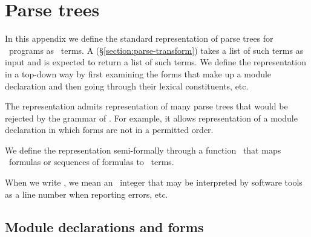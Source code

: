 %
%
%
%
%
%
%

\chapter{Parse trees}

\label{chapter:parse-trees}

In this appendix we define the standard representation of parse trees
for \Erlang\ programs as \Erlang\ terms.  A
(\S\ref{section:parse-transform}) takes a list of such terms as input
and is expected to return a list of such terms.  We define the
representation in a top-down way by first examining the forms that
make up a module declaration and then going through their lexical
constituents, etc.

The representation admits representation of many parse trees that
would be rejected by the grammar of \Erlang.  For example, it allows
representation of a module declaration in which forms are not in a
permitted order.

We define the representation semi-formally through a function \Rep\
that maps \Erlang\ formulas or sequences of formulas to \Erlang\
terms.

When we write \LINE, we mean an \Erlang\ integer that may be interpreted by
software tools as a line number when reporting errors, etc.
\index{L@\LINE|)}

\section{Module declarations and forms}

